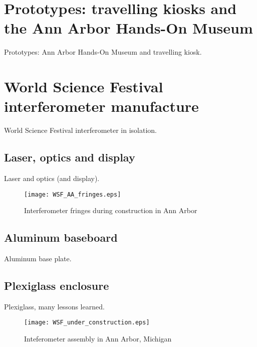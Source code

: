 
    \section{Prototypes: travelling kiosks and the Ann Arbor Hands-On Museum} 
    \label{prototypes}

        Prototypes: Ann Arbor Hands-On Museum and travelling kiosk.

    \section{World Science Festival interferometer manufacture}
    \label{manufacture}

        World Science Festival interferometer in isolation.

        \subsection{Laser, optics and display}
        \label{laser_display}

            Laser and optics (and display).

	\begin{figure}
	\begin{center}
	\texttt{[image: WSF\_AA\_fringes.eps]}
	\caption{Interferometer fringes during construction in Ann Arbor}
	\label{WSF_AA_fringes}
	\end{center}
	\end{figure}


        \subsection{Aluminum baseboard}
        \label{baseplate}

            Aluminum base plate.

        \subsection{Plexiglass enclosure}
        \label{enclosure}

            Plexiglass, many lessons learned.

	\begin{figure}
	\begin{center}
	\texttt{[image: WSF\_under\_construction.eps]}
	\caption{Inteferometer assembly in Ann Arbor, Michigan}
	\label{WSF_in_AA}
	\end{center}
	\end{figure}


